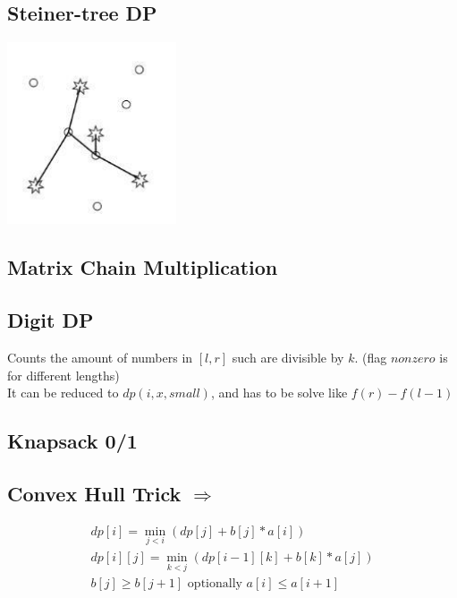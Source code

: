 
\subsection{Steiner-tree DP}
\includegraphics[width = 5cm]{../Codes/DynamicProgramming/SteinerTree.png}
\vspace{-15pt}

\subsection{Matrix Chain Multiplication}

\subsection{Digit DP} 
\vspace{-5pt}
Counts the amount of numbers in $[l, r]$ such are divisible by $k$. (flag $nonzero$ is for different lengths)  \\
It can be reduced to $dp(i, x, small)$, and has to be solve like $f(r) - f(l - 1)$ \\
\vspace{-5pt}
\vspace{-15pt}

\subsection{Knapsack 0/1}

\subsection{Convex Hull Trick  $\Rightarrow$ } 
\vspace{-15pt}
\begin{gather*}
dp[i] = \min_{j < i}(dp[j] + b[j] * a[i]) \\
dp[i][j] = \min_{k < j}(dp[i - 1][k] + b[k] * a[j]) \\
b[j] \geq b[j + 1] \text{ optionally } a[i] \leq a[i + 1] 
\end{gather*}
\vspace{-15pt}

